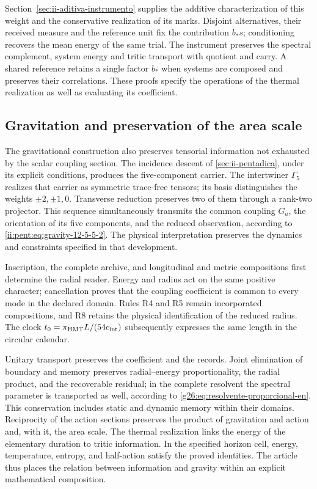 Section~\ref{sec:ii-aditiva-instrumento} supplies the additive
characterization of this weight and the conservative realization of its
marks. Disjoint alternatives, their received measure and the reference
unit fix the contribution $b_*s$; conditioning recovers the mean energy
of the same trial. The instrument preserves the spectral complement,
system energy and tritic transport with quotient and carry. A shared reference
retains a single factor $b_*$ when systems are composed and preserves
their correlations. These proofs specify the operations of the thermal
realization as well as evaluating its coefficient.

\subsection{Gravitation and preservation of the area scale}

The gravitational construction also preserves tensorial information
not exhausted by the scalar coupling section. The incidence descent
of \ref{sec:ii-pentadica}, under its explicit conditions, produces the
five-component carrier. The intertwiner \(\Gamma_5\) realizes that
carrier as symmetric trace-free tensors; its basis distinguishes the weights
\(\pm2,\pm1,0\). Transverse reduction preserves two of them through
a rank-two projector. This sequence simultaneously transmits the
common coupling \(G_a\), the orientation of its five components, and
the reduced observation, according to
\eqref{ii:pent:eq:gravity-12-5-5-2}. The physical interpretation preserves the
dynamics and constraints specified in that development.

Inscription, the complete archive, and longitudinal and metric
compositions first determine the radial reader. Energy and radius act
on the same positive character; cancellation proves that the coupling
coefficient is common to every mode in the declared domain. Rules R4
and R5 remain incorporated compositions, and R8 retains the physical
identification of the reduced radius. The clock
\(t_0=\pi_{\mathrm{HMT}}L/(54c_{\rm int})\) subsequently expresses the
same length in the circular calendar.

Unitary transport preserves the coefficient and the records. Joint
elimination of boundary and memory preserves radial--energy
proportionality, the radial product, and the recoverable residual;
in the complete resolvent the spectral parameter is transported as
well, according to \eqref{g26:eq:resolvente-proporcional-en}.
This conservation includes static and dynamic memory within their
domains. Reciprocity of the action sections preserves the
product of gravitation and action and, with it, the area scale. The
thermal realization links the energy of the elementary duration to
tritic information. In the specified horizon cell, energy,
temperature, entropy, and half-action satisfy the proved
identities. The article thus places the relation between information and
gravity within an explicit mathematical composition.

